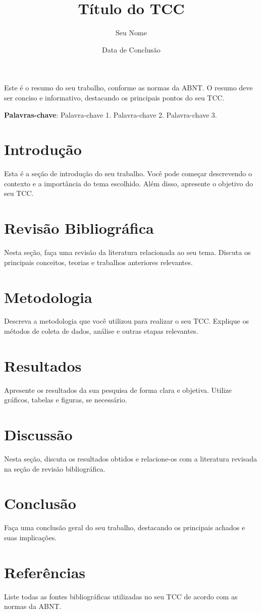 \documentclass[a4paper,12pt]{article}
\title{Título do TCC}
\author{Seu Nome}
\date{Data de Conclusão}
\begin{document}
\maketitle

\begin{resumo}
Este é o resumo do seu trabalho, conforme as normas da ABNT. O resumo deve ser conciso e informativo, destacando os principais pontos do seu TCC.
\end{resumo}

\textbf{Palavras-chave}: Palavra-chave 1. Palavra-chave 2. Palavra-chave 3.

\section{Introdução}
\label{sec:introducao}

Esta é a seção de introdução do seu trabalho. Você pode começar descrevendo o contexto e a importância do tema escolhido. Além disso, apresente o objetivo do seu TCC.

\section{Revisão Bibliográfica}
\label{sec:revisao}

Nesta seção, faça uma revisão da literatura relacionada ao seu tema. Discuta os principais conceitos, teorias e trabalhos anteriores relevantes.

\section{Metodologia}
\label{sec:metodologia}

Descreva a metodologia que você utilizou para realizar o seu TCC. Explique os métodos de coleta de dados, análise e outras etapas relevantes.

\section{Resultados}
\label{sec:resultados}

Apresente os resultados da sua pesquisa de forma clara e objetiva. Utilize gráficos, tabelas e figuras, se necessário.

\section{Discussão}
\label{sec:discussao}

Nesta seção, discuta os resultados obtidos e relacione-os com a literatura revisada na seção de revisão bibliográfica.

\section{Conclusão}
\label{sec:conclusao}

Faça uma conclusão geral do seu trabalho, destacando os principais achados e suas implicações.

\section{Referências}
\label{sec:referencias}

Liste todas as fontes bibliográficas utilizadas no seu TCC de acordo com as normas da ABNT.
\end{document}
